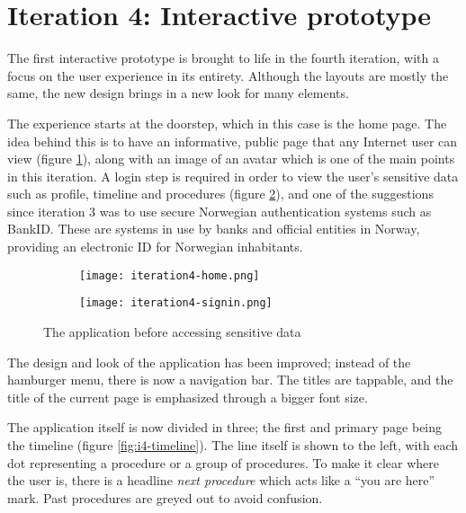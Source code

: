 \section{Iteration 4: Interactive prototype}
\label{sec:iteration4}

The first interactive prototype is brought to life in the fourth iteration, with a focus on the user experience in its entirety. Although the layouts are mostly the same, the new design brings in a new look for many elements.

The experience starts at the doorstep, which in this case is the home page. The idea behind this is to have an informative, public page that any Internet user can view (figure \ref{fig:i4-home}), along with an image of an avatar which is one of the main points in this iteration. A login step is required in order to view the user's sensitive data such as profile, timeline and procedures (figure \ref{fig:i4-signin}), and one of the suggestions since iteration 3 was to use secure Norwegian authentication systems such as BankID. These are systems in use by banks and official entities in Norway, providing an electronic ID for Norwegian inhabitants.

\begin{figure}
    \centering
    \begin{subfigure}{0.45\textwidth}
        \centering
        \texttt{[image: iteration4-home.png]}
        \label{fig:i4-home}
    \end{subfigure}
    \begin{subfigure}{0.45\textwidth}
        \centering
        \texttt{[image: iteration4-signin.png]}
        \label{fig:i4-signin}
    \end{subfigure}
    \caption{The application before accessing sensitive data}
    \label{fig:i4-welcome}
\end{figure}

The design and look of the application has been improved; instead of the hamburger menu, there is now a navigation bar. The titles are tappable, and the title of the current page is emphasized through a bigger font size.

The application itself is now divided in three; the first and primary page being the timeline (figure \ref{fig:i4-timeline}). The line itself is shown to the left, with each dot representing a procedure or a group of procedures. To make it clear where the user is, there is a headline \emph{next procedure} which acts like a \enquote{you are here} mark. Past procedures are greyed out to avoid confusion.

